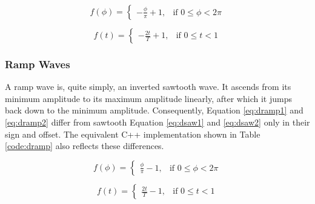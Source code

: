   \begin{multicols}{2}

    \begin{equation}
      f(\phi) =
      \begin{cases}
        -\frac{\phi}{\pi} + 1,& \text{if } 0 \leq \phi < 2 \pi
      \end{cases}
      \label{eq:dsaw1}
    \end{equation}

    \begin{equation}
      f(t) =
      \begin{cases}
        -\frac{2t}{T} + 1,& \text{if } 0 \leq t < 1
      \end{cases}
      \label{eq:dsaw2}
    \end{equation}

  \end{multicols}

  \begin{table}
  \end{table}

  \subsubsection{Ramp Waves}

  A ramp wave is, quite simply, an inverted sawtooth wave. It ascends from its minimum amplitude to its maximum amplitude linearly, after which it jumps back down to the minimum amplitude. Consequently, Equation  \ref{eq:dramp1} and \ref{eq:dramp2} differ from sawtooth Equation  \ref{eq:dsaw1} and \ref{eq:dsaw2} only in their sign and offset. The equivalent C++ implementation shown in Table \ref{code:dramp} also reflects these differences.

  \begin{multicols}{2}

    \begin{equation}
      f(\phi) =
      \begin{cases}
        \frac{\phi}{\pi} - 1,& \text{if } 0 \leq \phi < 2 \pi
      \end{cases}
      \label{eq:dramp1}
    \end{equation}

    \begin{equation}
      f(t) =
      \begin{cases}
        \frac{2t}{T} - 1,& \text{if } 0 \leq t < 1
      \end{cases}
      \label{eq:dramp2}
    \end{equation}

  \end{multicols}

